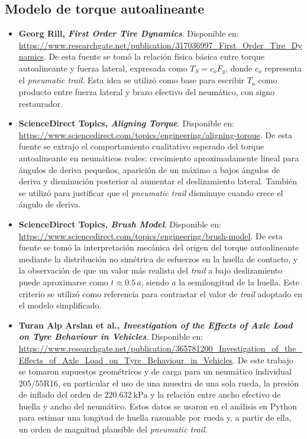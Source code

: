 \documentclass{article}
\begin{document}
\subsection*{Modelo de torque autoalineante}

\begin{itemize}
    \item \hypertarget{ref:rill-first-order}{}\textbf{Georg Rill, \textit{First Order Tire Dynamics}}. Disponible en: \url{https://www.researchgate.net/publication/317036997_First_Order_Tire_Dynamics}. De esta fuente se tomó la relación física básica entre torque autoalineante y fuerza lateral, expresada como $T_S = c_o F_y$, donde $c_o$ representa el \textit{pneumatic trail}. Esta idea se utilizó como base para escribir $T_a$ como producto entre fuerza lateral y brazo efectivo del neumático, con signo restaurador.

    \item \textbf{ScienceDirect Topics, \textit{Aligning Torque}}. Disponible en: \url{https://www.sciencedirect.com/topics/engineering/aligning-torque}. De esta fuente se extrajo el comportamiento cualitativo esperado del torque autoalineante en neumáticos reales: crecimiento aproximadamente lineal para ángulos de deriva pequeños, aparición de un máximo a bajos ángulos de deriva y disminución posterior al aumentar el deslizamiento lateral. También se utilizó para justificar que el \textit{pneumatic trail} disminuye cuando crece el ángulo de deriva.

    \item \textbf{ScienceDirect Topics, \textit{Brush Model}}. Disponible en: \url{https://www.sciencedirect.com/topics/engineering/brush-model}. De esta fuente se tomó la interpretación mecánica del origen del torque autoalineante mediante la distribución no simétrica de esfuerzos en la huella de contacto, y la observación de que un valor más realista del \textit{trail} a bajo deslizamiento puede aproximarse como $t \approx 0.5\,a$, siendo $a$ la semilongitud de la huella. Este criterio se utilizó como referencia para contrastar el valor de \textit{trail} adoptado en el modelo simplificado.

    \item \textbf{Turan Alp Arslan et al., \textit{Investigation of the Effects of Axle Load on Tyre Behaviour in Vehicles}}. Disponible en: \url{https://www.researchgate.net/publication/365781200_Investigation_of_the_Effects_of_Axle_Load_on_Tyre_Behaviour_in_Vehicles}. De este trabajo se tomaron supuestos geométricos y de carga para un neumático individual 205/55R16, en particular el uso de una muestra de una sola rueda, la presión de inflado del orden de $220.632\ \mathrm{kPa}$ y la relación entre ancho efectivo de huella y ancho del neumático. Estos datos se usaron en el análisis en Python para estimar una longitud de huella razonable por rueda y, a partir de ella, un orden de magnitud plausible del \textit{pneumatic trail}.


\end{itemize}
\end{document}
